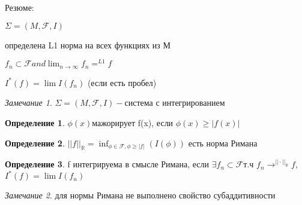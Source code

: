 \documentclass[a4paper, 12pt]{article}
\theoremstyle{definition}
\newtheorem*{definition}{Определение}
\theoremstyle{remark}
\newtheorem*{remark}{Замечание}
\begin{document}
     Резюме:

     $\Sigma = (M, \mathcal{F} , I)$

     определена L1 норма на всех функциях из М

     $f_n\subset \mathcal{F} and \lim_{n\to\infty}f_n =^{L1} f$

     $I^*(f) = \lim I(f_n)$ (если есть пробел)
\begin{remark}
     $\Sigma = (M, \mathcal{F}, I) -$система с интегрированием
\end{remark}
\begin{definition}
     $\phi(x)$мажорирует f(x), если $\phi(x)\geq |f(x)|$
\end{definition}
\begin{definition}
     $||f||_{\mathbb{R} } = \inf_{\phi \in \mathcal{F}, \phi \geq |f|} (I(\phi))$ есть норма Римана
\end{definition}
\begin{definition}
     f интегрируема в смысле Римана, если $\exists f_n\subset \mathcal{F} $т.ч $f_n\to^{||\cdot||_\mathbb{R} } f$,
     $I^*(f) = \lim I(f_n)$
\end{definition}
\begin{remark}
     для нормы Римана не выполнено свойство субаддитивности
\end{remark}
\end{document}
